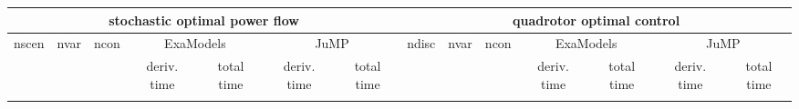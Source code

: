 \documentclass{standalone}
\begin{document}
\centering
\begin{tabular}{|c|c|c|cc|cc|c|c|c|cc|cc|}
  \hline
  \multicolumn{7}{|c|}{\textbf{stochastic optimal power flow}} & \multicolumn{7}{|c|}{\textbf{quadrotor optimal control}} \\\hline 
  \multirow{2}{*}{nscen}
  &
  \multirow{2}{*}{nvar}&
  \multirow{2}{*}{ncon}&
  \multicolumn{2}{|c|}{ExaModels} & \multicolumn{2}{|c|}{JuMP} &
  \multirow{2}{*}{ndisc}
  &
  \multirow{2}{*}{nvar}&
  \multirow{2}{*}{ncon}&
  \multicolumn{2}{|c|}{ExaModels} & \multicolumn{2}{|c|}{JuMP}  \\
  \cline{4-7}
  \cline{11-14} 
  &
  & 
  & deriv. time & total time& deriv. time & total time
  &
  &
  & 
  & deriv. time & total time& deriv. time & total time
  \\
  \\
  \hline
\end{tabular}
\end{document}

